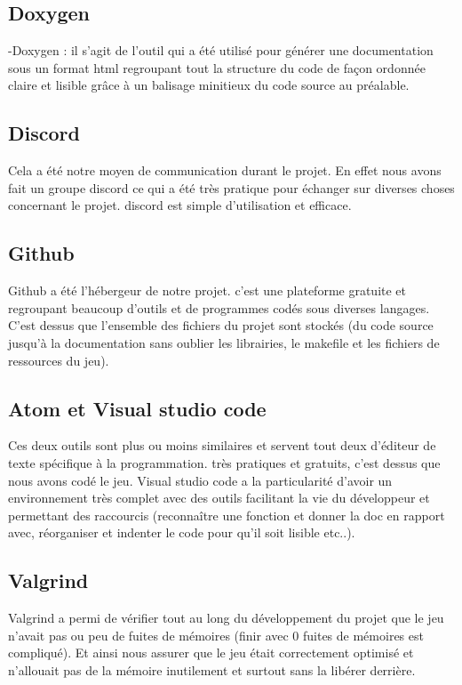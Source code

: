 \documentclass[a4paper,11pt]{article}
\begin{document}
\subsection{Doxygen}
-Doxygen : il s'agit de l'outil qui a été utilisé pour générer une documentation sous un format html regroupant tout la structure du code
de façon ordonnée claire et lisible grâce à un balisage minitieux du code source au préalable. \\
\subsection{Discord}
Cela a été notre moyen de communication durant le projet. En effet nous avons fait un groupe discord ce qui a été très pratique pour échanger
sur diverses choses concernant le projet. discord est simple d'utilisation et efficace.\\
\subsection{Github}
Github a été l'hébergeur de notre projet. c'est une plateforme gratuite et regroupant beaucoup d'outils et de programmes codés sous diverses langages.
C'est dessus que l'ensemble des fichiers du projet sont stockés (du code source jusqu'à la documentation sans oublier les librairies, le makefile et les fichiers de ressources du jeu).\\
\subsection{Atom et Visual studio code}
Ces deux outils sont plus ou moins similaires et servent tout deux d'éditeur de texte spécifique à la programmation. très pratiques et gratuits, c'est dessus que nous avons codé le jeu.
Visual studio code a la particularité d'avoir un environnement très complet avec des outils facilitant la vie du développeur et permettant des raccourcis (reconnaître une fonction et donner la doc en rapport avec, réorganiser et indenter le code pour qu'il soit lisible etc..).\\
\subsection{Valgrind}
Valgrind a permi de vérifier tout au long du développement du projet que le jeu n'avait pas ou peu de fuites de mémoires (finir avec 0 fuites de mémoires est compliqué). Et ainsi nous
assurer que le jeu était correctement optimisé et n'allouait pas de la mémoire inutilement et surtout sans la libérer derrière.\\
\end{document}
